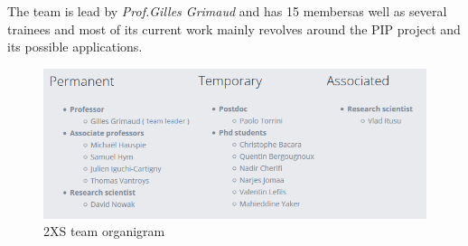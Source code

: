 The team is lead by \textit{Prof.Gilles Grimaud} and has 15 members\footnotemark[1] as well as several trainees and most of its current work mainly revolves around the PIP project and its possible applications.

\begin{figure}[!ht]
	\centering 
	\includegraphics[width=\linewidth, frame]{img/2XS.png} 
	\caption{2XS team organigram}
\end{figure}





